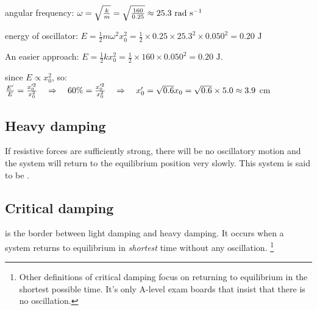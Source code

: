 
\begin{soln}
     angular frequency: $\omega = \sqrt{\frac{k}{m}} = \sqrt{\frac{160}{0.25}} \approx 25.3 \text{ rad s$^{-1}$} \,$

energy of oscillator: $E=\frac{1}{2}m\omega^2x_0^2 = \frac{1}{2} \times 0.25 \times 25.3^2 \times 0.050^2 = 0.20 \text{ J} $

An easier approach: $E = \frac{1}{2}kx_0^2 = \frac{1}{2} \times 160 \times 0.050^2 = 0.20 \text{ J}$.

since $E \propto x_0^2$, so: $\frac{E'}{E} = \frac{x^{\prime2}_0}{x_0^2} \quad \Rightarrow \quad  60\% = \frac{x^{\prime2}_0}{x_0^2} \quad \Rightarrow \quad x'_0 = \sqrt{0.6} x_0 = \sqrt{0.6} \times 5.0 \approx 3.9$ cm \end{soln}


\subsection{Heavy damping}

If resistive forces are sufficiently strong, there will be no oscillatory motion and the system will return to the equilibrium position very slowly. This system is said to be .

\subsection{Critical damping}

 is the border between light damping and heavy damping. It occurs when a system returns to equilibrium in \emph{shortest} time without any oscillation. \footnote[][-2cm]{\piste Other definitions of critical damping focus on returning to equilibrium in the shortest possible time. It's only A-level exam boards that insist that there is no oscillation.}

